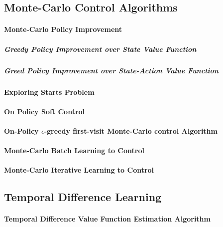 	\subsection{Monte-Carlo Control Algorithms} %
		\label{sub:monte_carlo_control_algorithms}
	
		\paragraph*{Monte-Carlo Policy Improvement}

			\subparagraph*{Greedy Policy Improvement over State Value Function}

			\subparagraph*{Greed Policy Improvement over State-Action Value Function}

		\paragraph*{Exploring Starts Problem}

		\paragraph*{On Policy Soft Control}
		
		\paragraph*{On-Policy $\epsilon$-greedy first-visit Monte-Carlo control Algorithm}

		\paragraph*{Monte-Carlo Batch Learning to Control}

		\paragraph*{Monte-Carlo Iterative Learning to Control}

	\subsection{Temporal Difference Learning} %
		\label{sub:temporal_difference_learning}
		
		\paragraph*{Temporal Difference Value Function Estimation Algorithm}

